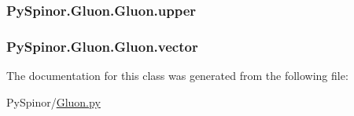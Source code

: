\subsubsection[{upper}]{\setlength{\rightskip}{0pt plus 5cm}Py\+Spinor.\+Gluon.\+Gluon.\+upper}\label{class_py_spinor_1_1_gluon_1_1_gluon_afc4fcbb98438d15efdfea2df9702c6ac}
\hypertarget{class_py_spinor_1_1_gluon_1_1_gluon_aa77d6b321ed6a1cb5dbf72bd1f6645f0}{}
\subsubsection[{vector}]{\setlength{\rightskip}{0pt plus 5cm}Py\+Spinor.\+Gluon.\+Gluon.\+vector}\label{class_py_spinor_1_1_gluon_1_1_gluon_aa77d6b321ed6a1cb5dbf72bd1f6645f0}


The documentation for this class was generated from the following file\+:\begin{DoxyCompactItemize}
\item 
Py\+Spinor/\hyperlink{_gluon_8py}{Gluon.\+py}\end{DoxyCompactItemize}
